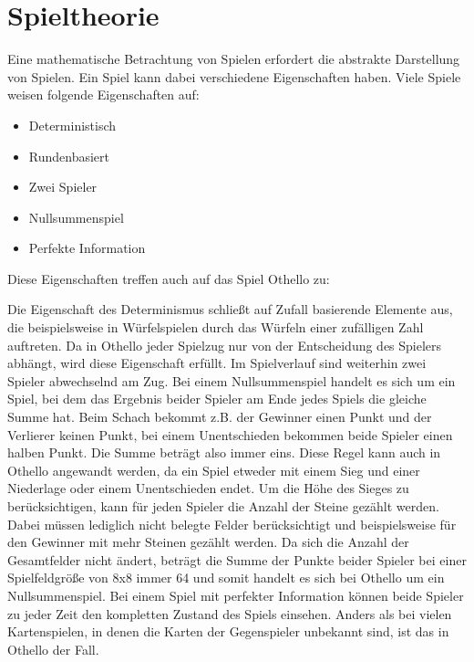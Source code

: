 \section{Spieltheorie}

Eine mathematische Betrachtung von Spielen erfordert die abstrakte Darstellung von Spielen.
Ein Spiel kann dabei verschiedene Eigenschaften haben. Viele Spiele weisen folgende Eigenschaften auf:

\begin{itemize}
    \item Deterministisch
    \item Rundenbasiert
    \item Zwei Spieler
    \item Nullsummenspiel
    \item Perfekte Information
\end{itemize}

Diese Eigenschaften treffen auch auf das Spiel Othello zu:

Die Eigenschaft des Determinismus schließt auf Zufall basierende Elemente aus, die beispielsweise in Würfelspielen durch das Würfeln einer zufälligen Zahl auftreten.
Da in Othello jeder Spielzug nur von der Entscheidung des Spielers abhängt, wird diese Eigenschaft erfüllt.
Im Spielverlauf sind weiterhin zwei Spieler abwechselnd am Zug.
Bei einem Nullsummenspiel handelt es sich um ein Spiel, bei dem das Ergebnis beider Spieler am Ende jedes Spiels die gleiche Summe hat.
Beim Schach bekommt z.B. der Gewinner einen Punkt und der Verlierer keinen Punkt, bei einem Unentschieden bekommen beide Spieler einen halben Punkt.
Die Summe beträgt also immer eins.
Diese Regel kann auch in Othello angewandt werden, da ein Spiel etweder mit einem Sieg und einer Niederlage oder einem Unentschieden endet.
Um die Höhe des Sieges zu berücksichtigen, kann für jeden Spieler die Anzahl der Steine gezählt werden.
Dabei müssen lediglich nicht belegte Felder berücksichtigt und beispielsweise für den Gewinner mit mehr Steinen gezählt werden.
Da sich die Anzahl der Gesamtfelder nicht ändert, beträgt die Summe der Punkte beider Spieler bei einer Spielfeldgröße von 8x8 immer 64 und somit handelt es sich bei Othello um ein Nullsummenspiel.
Bei einem Spiel mit perfekter Information können beide Spieler zu jeder Zeit den kompletten Zustand des Spiels einsehen.
Anders als bei vielen Kartenspielen, in denen die Karten der Gegenspieler unbekannt sind, ist das in Othello der Fall.
\cite[S.~161f.]{ai2010russel}

